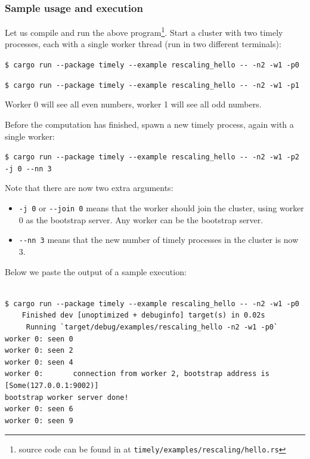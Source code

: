 \documentclass[12pt]{extarticle}
\begin{document}
\subsubsection{Sample usage and execution}

Let us compile and run the above program\footnote{source code can be found in at \verb|timely/examples/rescaling/hello.rs|}.
Start a cluster with two timely processes, each with a single worker thread (run in two different terminals):

\vspace{2mm}
\noindent
\verb|$ cargo run --package timely --example rescaling_hello -- -n2 -w1 -p0|

\noindent
\verb|$ cargo run --package timely --example rescaling_hello -- -n2 -w1 -p1|

\vspace{2mm}
Worker 0 will see all even numbers, worker 1 will see all odd numbers.

\noindent
Before the computation has finished, spawn a new timely process, again with a single worker:

\vspace{2mm}
\noindent
\verb|$ cargo run --package timely --example rescaling_hello -- -n2 -w1 -p2 -j 0 --nn 3| 

\vspace{2mm}
\noindent
Note that there are now two extra arguments:
\begin{itemize}
    \item \verb|-j 0| or \verb|--join 0| means that the worker should join the cluster, using worker 0 as the bootstrap server.
        Any worker can be the bootstrap server.
    \item \verb|--nn 3| means that the new number of timely processes in the cluster is now 3.
\end{itemize}

Below we paste the output of a sample execution:

\begin{verbatim}

$ cargo run --package timely --example rescaling_hello -- -n2 -w1 -p0
    Finished dev [unoptimized + debuginfo] target(s) in 0.02s
     Running `target/debug/examples/rescaling_hello -n2 -w1 -p0`
worker 0: seen 0
worker 0: seen 2
worker 0: seen 4
worker 0:       connection from worker 2, bootstrap address is [Some(127.0.0.1:9002)]
bootstrap worker server done!
worker 0: seen 6
worker 0: seen 9
\end{verbatim}
\end{document}
